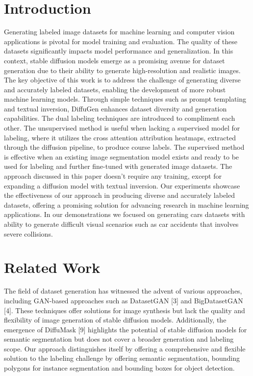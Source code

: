 \documentclass{article}
\begin{document}
\section{Introduction}
Generating labeled image datasets for machine learning and computer vision applications is pivotal for model training and evaluation. The quality of these datasets significantly impacts model performance and generalization. In this context, stable diffusion models emerge as a promising avenue for dataset generation due to their ability to generate high-resolution and realistic images. The key objective of this work is to address the challenge of generating diverse and accurately labeled datasets, enabling the development of more robust machine learning models. Through simple techniques such as prompt templating and textual inversion, DiffuGen enhances dataset diversity and generation capabilities. The dual labeling techniques are introduced to compliment each other. The unsupervised method is useful when lacking a supervised model for labeling, where it utilizes the cross attention attribution heatmaps, extracted through the diffusion pipeline, to produce course labels.  The supervised method is effective when an existing image segmentation model exists and ready to be used for labeling and further fine-tuned with generated image datasets. The approach discussed in this paper doesn't require any training, except for expanding a diffusion model with textual inversion. Our experiments showcase the effectiveness of our approach in producing diverse and accurately labeled datasets, offering a promising solution for advancing research in machine learning applications. In our demonstrations we focused on generating cars datasets with ability to generate difficult visual scenarios such as car accidents that involves severe collisions. 

\section{Related Work}

The field of dataset generation has witnessed the advent of various approaches, including GAN-based approaches such as DatasetGAN [3] and BigDatasetGAN [4]. These techniques offer solutions for image synthesis but lack the quality and flexibility of image generation of stable diffusion models. Additionally, the emergence of DiffuMask [9] highlights the potential of stable diffusion models for semantic segmentation but does not cover a broader generation and labeling scope. Our approach distinguishes itself by offering a comprehensive and flexible solution to the labeling challenge by offering semantic segmentation, bounding polygons for instance segmentation and bounding boxes for object detection.
\end{document}
